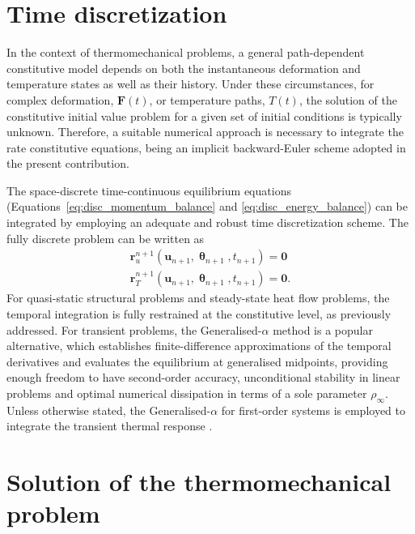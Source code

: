 \section{Time discretization}

In the context of thermomechanical problems, a general path-dependent constitutive model depends on both the instantaneous deformation and temperature states as well as their history.
Under these circumstances, for complex deformation, $\bm{F}(t)$, or temperature paths, $T(t)$, the solution of the constitutive initial value problem for a given set of initial conditions is typically unknown.
Therefore, a suitable numerical approach is necessary to integrate the rate constitutive equations, being an implicit backward-Euler scheme adopted in the present contribution.

The space-discrete time-continuous equilibrium equations (Equations~\eqref{eq:disc_momentum_balance} and \eqref{eq:disc_energy_balance}) can be integrated by employing an adequate and robust time discretization scheme.
The fully discrete problem can be written as 
\begin{gather}
  \mathbf{r}_{u}^{n+1}(\mathbf{u}_{n+1}, \bm{\uptheta}_{n+1}, t_{n+1})=\bm{0}\,\label{eq:mech_problem}\\
  \mathbf{r}_{T}^{n+1}(\mathbf{u}_{n+1}, \bm{\uptheta}_{n+1}, t_{n+1}) = \bm{0}. \label{eq:therm_problem}
\end{gather}
For quasi-static structural problems and steady-state heat flow problems, the temporal integration is fully restrained at the constitutive level, as previously addressed.
For transient problems, the Generalised-$\alpha$ method is a popular alternative, which establishes finite-difference approximations of the temporal derivatives and evaluates the equilibrium at generalised midpoints, providing enough freedom to have second-order accuracy, unconditional stability in linear problems and optimal numerical dissipation in terms of a sole parameter $\rho_{\infty}$.
Unless otherwise stated, the Generalised-$\alpha$ for first-order systems is employed to integrate the transient thermal response \citep{jansen2000GeneralizedaMethodIntegrating}.

\section{Solution of the thermomechanical problem}

